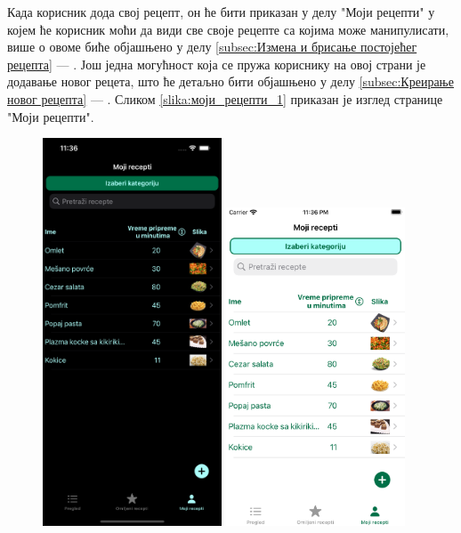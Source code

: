 \documentclass[12pt,oneside]{memoir}
\begin{document}
\indent Када корисник дода свој рецепт, он ће бити приказан у делу "Моји рецепти" у којем ће корисник моћи да види све своје рецепте са којима може манипулисати, више о овоме биће објашњено у делу \ref{subsec:Измена и брисање постојећег рецепта} --- . Још једна могућност која се пружа кориснику на овој страни је додавање новог рецета, што ће детаљно бити објашњено у делу \ref{subsec:Креирање новог рецепта} --- . Сликом \ref{slika:моји_рецепти_1} приказан је изглед странице "Моји рецепти".

\begin{figure} [H]
    \centering
    \captionsetup{justification=centering}
    \includegraphics[width=0.475\textwidth]{images/simulators/view images/dark - my recipes.png} 
    \hfill
    \includegraphics[width=0.475\textwidth]{images/simulators/view images/light - my recipes.png}

\end{figure}
\end{document}
